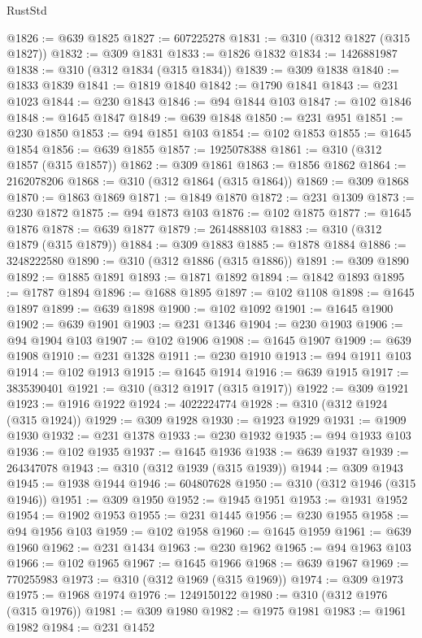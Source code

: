 \begin{lexlean}{RustStd}
\begin{coremodule}
{\begin{coremodule}
{{{{{{{{{{{{{{{{{{{{{{{{{{{{{{{{{{{{{@1826 := @639 @1825
@1827 := 607225278
@1831 := @310 (@312 @1827 (@315 @1827))
@1832 := @309 @1831
@1833 := @1826 @1832
@1834 := 1426881987
@1838 := @310 (@312 @1834 (@315 @1834))
@1839 := @309 @1838
@1840 := @1833 @1839
@1841 := @1819 @1840
@1842 := @1790 @1841
@1843 := @231 @1023
@1844 := @230 @1843
@1846 := @94 @1844 @103
@1847 := @102 @1846
@1848 := @1645 @1847
@1849 := @639 @1848
@1850 := @231 @951
@1851 := @230 @1850
@1853 := @94 @1851 @103
@1854 := @102 @1853
@1855 := @1645 @1854
@1856 := @639 @1855
@1857 := 1925078388
@1861 := @310 (@312 @1857 (@315 @1857))
@1862 := @309 @1861
@1863 := @1856 @1862
@1864 := 2162078206
@1868 := @310 (@312 @1864 (@315 @1864))
@1869 := @309 @1868
@1870 := @1863 @1869
@1871 := @1849 @1870
@1872 := @231 @1309
@1873 := @230 @1872
@1875 := @94 @1873 @103
@1876 := @102 @1875
@1877 := @1645 @1876
@1878 := @639 @1877
@1879 := 2614888103
@1883 := @310 (@312 @1879 (@315 @1879))
@1884 := @309 @1883
@1885 := @1878 @1884
@1886 := 3248222580
@1890 := @310 (@312 @1886 (@315 @1886))
@1891 := @309 @1890
@1892 := @1885 @1891
@1893 := @1871 @1892
@1894 := @1842 @1893
@1895 := @1787 @1894
@1896 := @1688 @1895
@1897 := @102 @1108
@1898 := @1645 @1897
@1899 := @639 @1898
@1900 := @102 @1092
@1901 := @1645 @1900
@1902 := @639 @1901
@1903 := @231 @1346
@1904 := @230 @1903
@1906 := @94 @1904 @103
@1907 := @102 @1906
@1908 := @1645 @1907
@1909 := @639 @1908
@1910 := @231 @1328
@1911 := @230 @1910
@1913 := @94 @1911 @103
@1914 := @102 @1913
@1915 := @1645 @1914
@1916 := @639 @1915
@1917 := 3835390401
@1921 := @310 (@312 @1917 (@315 @1917))
@1922 := @309 @1921
@1923 := @1916 @1922
@1924 := 4022224774
@1928 := @310 (@312 @1924 (@315 @1924))
@1929 := @309 @1928
@1930 := @1923 @1929
@1931 := @1909 @1930
@1932 := @231 @1378
@1933 := @230 @1932
@1935 := @94 @1933 @103
@1936 := @102 @1935
@1937 := @1645 @1936
@1938 := @639 @1937
@1939 := 264347078
@1943 := @310 (@312 @1939 (@315 @1939))
@1944 := @309 @1943
@1945 := @1938 @1944
@1946 := 604807628
@1950 := @310 (@312 @1946 (@315 @1946))
@1951 := @309 @1950
@1952 := @1945 @1951
@1953 := @1931 @1952
@1954 := @1902 @1953
@1955 := @231 @1445
@1956 := @230 @1955
@1958 := @94 @1956 @103
@1959 := @102 @1958
@1960 := @1645 @1959
@1961 := @639 @1960
@1962 := @231 @1434
@1963 := @230 @1962
@1965 := @94 @1963 @103
@1966 := @102 @1965
@1967 := @1645 @1966
@1968 := @639 @1967
@1969 := 770255983
@1973 := @310 (@312 @1969 (@315 @1969))
@1974 := @309 @1973
@1975 := @1968 @1974
@1976 := 1249150122
@1980 := @310 (@312 @1976 (@315 @1976))
@1981 := @309 @1980
@1982 := @1975 @1981
@1983 := @1961 @1982
@1984 := @231 @1452
}}}}}}}}}}}}}}}}}}}}}}}}}}}}}}}}}}}}}
\end{coremodule}}
\end{coremodule}
\end{lexlean}
